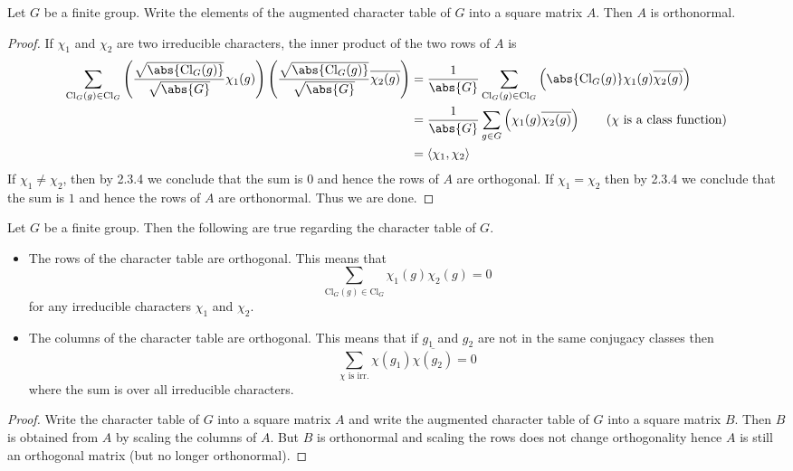 \documentclass[a4paper]{article}
\begin{document}
\begin{prp}{}{} Let $G$ be a finite group. Write the elements of the augmented character table of $G$ into a square matrix $A$. Then $A$ is orthonormal. \tcbline
\begin{proof}
If $\chi_1$ and $\chi_2$ are two irreducible characters, the inner product of the two rows of $A$ is 
\begin{align*}
\sum_{\text{Cl}_G(g)\in\text{Cl}_G}\left(\frac{\sqrt{\abs{\text{Cl}_G(g)}}}{\sqrt{\abs{G}}}\chi_1(g)\right)\left(\frac{\sqrt{\abs{\text{Cl}_G(g)}}}{\sqrt{\abs{G}}}\overline{\chi_2(g)}\right)&=\frac{1}{\abs{G}}\sum_{\text{Cl}_G(g)\in\text{Cl}_G}\left(\abs{\text{Cl}_G(g)}\chi_1(g)\overline{\chi_2(g)}\right)\\
&=\frac{1}{\abs{G}}\sum_{g\in G}\left(\chi_1(g)\overline{\chi_2(g)}\right)\tag{$\chi$ is a class function}\\
&=\langle\chi_1,\chi_2\rangle
\end{align*}
If $\chi_1\neq\chi_2$, then by 2.3.4 we conclude that the sum is $0$ and hence the rows of $A$ are orthogonal. If $\chi_1=\chi_2$ then by 2.3.4 we conclude that the sum is $1$ and hence the rows of $A$ are orthonormal. Thus we are done. 
\end{proof}
\end{prp}

\begin{crl}{}{} Let $G$ be a finite group. Then the following are true regarding the character table of $G$. 
\begin{itemize}
\item The rows of the character table are orthogonal. This means that $$\sum_{\text{Cl}_G(g)\in\text{Cl}_G}\chi_1(g)\chi_2(g)=0$$ for any irreducible characters $\chi_1$ and $\chi_2$. 
\item The columns of the character table are orthogonal. This means that if $g_1$ and $g_2$ are not in the same conjugacy classes then $$\sum_{\chi\text{ is irr.}}\chi(g_1)\overline{\chi(g_2)}=0$$ where the sum is over all irreducible characters.
\end{itemize} \tcbline
\begin{proof}
Write the character table of $G$ into a square matrix $A$ and write the augmented character table of $G$ into a square matrix $B$. Then $B$ is obtained from $A$ by scaling the columns of $A$. But $B$ is orthonormal and scaling the rows does not change orthogonality hence $A$ is still an orthogonal matrix (but no longer orthonormal). 
\end{proof}
\end{crl}
\end{document}

